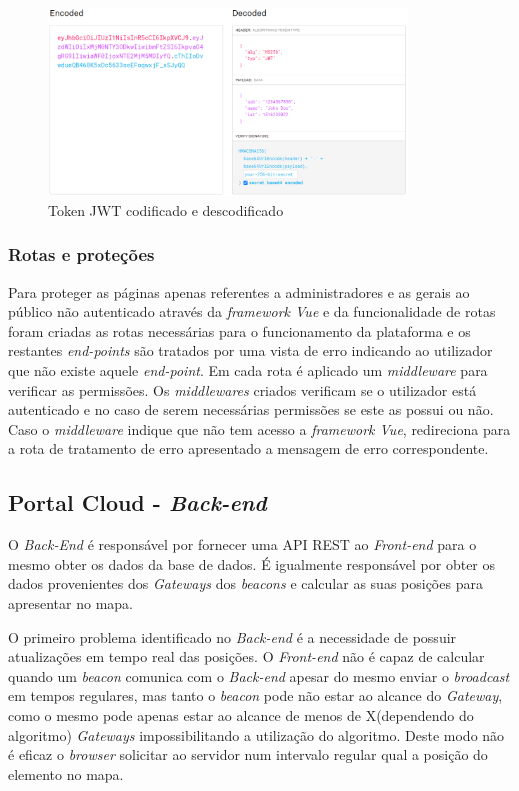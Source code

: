 \begin{figure}[ht]
\centering
\includegraphics[width=0.85\textwidth]{images/jwt.png}
\caption{Token JWT codificado e descodificado \cite{jwt}}\label{jwt1}
\end{figure}

\subsubsection{Rotas e proteções}

\par Para proteger as páginas apenas referentes a administradores e as gerais ao público não autenticado através da \textit{framework Vue} e da funcionalidade de rotas foram criadas as rotas necessárias para o funcionamento da plataforma e os restantes \textit{end-points} são tratados por uma vista de erro indicando ao utilizador que não existe aquele \textit{end-point}. Em cada rota é aplicado um \textit{middleware} para verificar as permissões. Os \textit{middlewares} criados verificam se o utilizador está autenticado e no caso de serem necessárias permissões se este as possui ou não. Caso o \textit{middleware} indique que não tem acesso a \textit{framework Vue}, redireciona para a rota de tratamento de erro apresentado a mensagem de erro correspondente.

\subsection{Portal Cloud - \textit{Back-end}}

\par O \textit{Back-End} é responsável por fornecer uma API REST ao \textit{Front-end} para o mesmo obter os dados da base de dados. É igualmente responsável por obter os dados provenientes dos \textit{Gateways} dos \textit{beacons} e calcular as suas posições para apresentar no mapa. 

\par O primeiro problema identificado no \textit{Back-end} é a necessidade de possuir atualizações em tempo real das posições. O \textit{Front-end} não é capaz de calcular quando um \textit{beacon} comunica com o \textit{Back-end} apesar do mesmo enviar o \textit{broadcast} em tempos regulares, mas tanto o \textit{beacon} pode não estar ao alcance do \textit{Gateway}, como o mesmo pode apenas estar ao alcance de menos de X(dependendo do algoritmo) \textit{Gateways} impossibilitando a utilização do algoritmo. Deste modo não é eficaz o \textit{browser} solicitar ao servidor num intervalo regular qual a posição do elemento no mapa.

